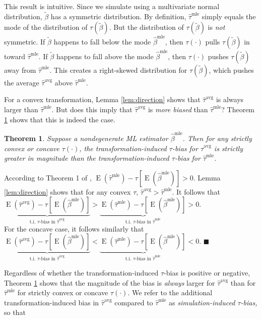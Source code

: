 \documentclass[11pt]{article}
\newtheorem{theorem}{Theorem}
\newenvironment{proof}[1][Proof]{\begin{trivlist}
\item[\hskip \labelsep {\bfseries #1}]}{\end{trivlist}}
\DeclareMathOperator*{\E}{\text{E}}
\begin{document}
\noindent This result is intuitive. Since we simulate using a multivariate normal distribution, $\tilde{\beta}$ has a symmetric distribution. By definition, $\hat{\tau}^\text{mle}$ simply equals the mode of the distribution of $\tau(\tilde{\beta})$. But the distribution of $\tau(\tilde{\beta})$ is \emph{not} symmetric. If $\tilde{\beta}$ happens to fall below the mode $\hat{\beta}^\text{mle}$, then $\tau(\cdot)$ pulls $\tau(\tilde{\beta})$ in toward $\hat{\tau}^\text{mle}$.
If $\tilde{\beta}$ happens to fall above the mode $\hat{\beta}^\text{mle}$, then $\tau(\cdot)$ pushes $\tau(\tilde{\beta})$ away from $\hat{\tau}^\text{mle}$. This creates a right-skewed distribution for $\tau(\tilde{\beta})$, which pushes the average $\hat{\tau}^\text{avg}$ above $\hat{\tau}^\text{mle}$.

For a convex transformation, Lemma \ref{lem:direction} shows that $\hat{\tau}^\text{avg}$ is always larger than $\hat{\tau}^\text{mle}$.
But does this imply that $\hat{\tau}^\text{avg}$ is \textit{more biased} than $\hat{\tau}^\text{mle}$? Theorem \ref{thm:direction} shows that this is indeed the case.

\begin{theorem}\label{thm:direction}
Suppose a nondegenerate ML estimator $\hat{\beta}^\text{mle}$.
Then for any strictly convex or concave $\tau(\cdot)$, the transformation-induced $\tau$-bias for $\hat{\tau}^{\text{avg}}$ is strictly greater in magnitude than the transformation-induced $\tau$-bias for $\hat{\tau}^{\text{mle}}$.
\end{theorem}
\begin{proof}
According to Theorem 1 of \citet[p.\@ 405]{Rainey2017}, $\E \left( \hat{\tau}^\text{mle}\right) -  \tau \left[\E \left( \hat{\beta}^\text{mle} \right) \right] > 0$.
Lemma \ref{lem:direction} shows that for any convex $\tau$, $\hat{\tau}^{\text{avg}} > \hat{\tau}^\text{mle}$.
It follows that $\underbrace{\E \left( \hat{\tau}^\text{avg}\right) - \tau \left[\E \left( \hat{\beta}^\text{mle} \right) \right]}_{\text{t.i. } \tau\text{-bias in }\hat{\tau}^{\text{avg}}} > \underbrace{\E \left( \hat{\tau}^\text{mle}\right) -  \tau \left[\E \left( \hat{\beta}^\text{mle} \right) \right]}_{\text{t.i. } \tau\text{-bias in }\hat{\tau}^{\text{mle}}} > 0$.\\

\noindent For the concave case, it follows similarly that $\underbrace{\E \left( \hat{\tau}^\text{avg}\right) - \tau \left[\E \left( \hat{\beta}^\text{mle} \right) \right]}_{\text{t.i. } \tau\text{-bias in }\hat{\tau}^{\text{avg}}} < \underbrace{\E \left( \hat{\tau}^\text{mle}\right) -  \tau \left[\E \left( \hat{\beta}^\text{mle} \right) \right]}_{\text{t.i. } \tau\text{-bias in }\hat{\tau}^{\text{mle}}} < 0$.
 $\blacksquare$
\end{proof}
Regardless of whether the transformation-induced $\tau$-bias is positive or negative, Theorem \ref{thm:direction} shows that the magnitude of the bias is \textit{always} larger for $\hat{\tau}^{\text{avg}}$ than for  $\hat{\tau}^{\text{mle}}$ for strictly convex or concave $\tau(\cdot)$. We refer to the additional transformation-induced bias in $\hat{\tau}^\text{avg}$ compared to $\hat{\tau}^\text{mle}$ as {\it simulation-induced $\tau$-bias,} so that
\end{document}
